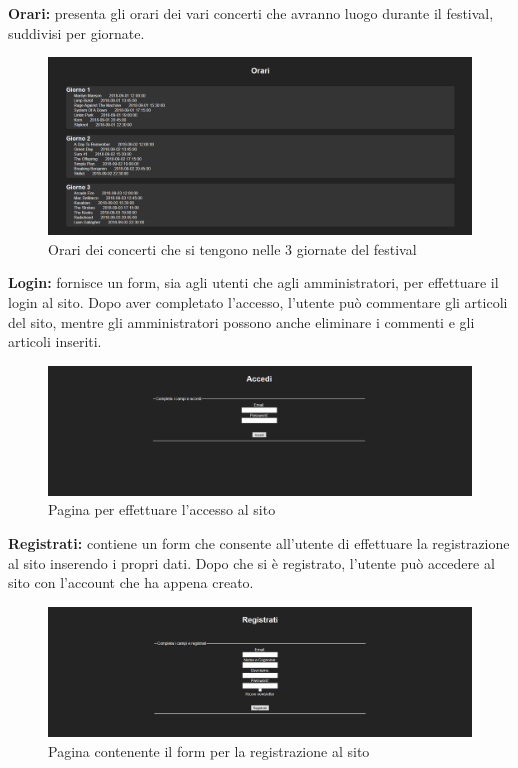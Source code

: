 \documentclass[10pt, a4paper]{article}
\begin{document}
\newpage

\begin{flushleft} \textbf{Orari: }presenta gli orari dei vari concerti che avranno luogo durante il festival, suddivisi per giornate. \end{flushleft}
\begin{figure}[h!]
 \centering
  \includegraphics[width=1\textwidth]{Images/orari.png}
  \caption{Orari dei concerti che si tengono nelle 3 giornate del festival}
  \label{fig:orari}
\end{figure}

\begin{flushleft} \textbf{Login: }fornisce un form, sia agli utenti che agli amministratori, per effettuare il login al sito. Dopo aver completato l'accesso, l'utente può commentare gli articoli del sito, mentre gli amministratori possono anche eliminare i commenti e gli articoli inseriti. \end{flushleft}
\begin{figure}[h!]
 \centering
  \includegraphics[width=1\textwidth]{Images/login.png}
  \caption{Pagina per effettuare l'accesso al sito}
  \label{fig:login}
\end{figure}
\begin{flushleft} \textbf{Registrati: }contiene un form che consente all'utente di effettuare la registrazione al sito inserendo i propri dati. Dopo che si è registrato, l'utente può accedere al sito con l'account che ha appena creato. \end{flushleft}
\begin{figure}[h!]
 \centering
  \includegraphics[width=1\textwidth]{Images/registrazione.png}
  \caption{Pagina contenente il form per la registrazione al sito}
  \label{fig:registrazione}
\end{figure}
\end{document}
